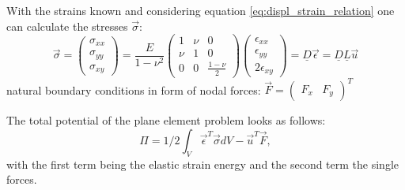 \documentclass[11pt,twoside]{scrartcl}
\begin{document}
  With the strains known and considering equation \ref{eq:displ_strain_relation} one can calculate the stresses $\vec{\sigma}$:
  \begin{equation}
  \vec{\sigma} = \begin{pmatrix}
  \sigma_{xx} \\
  \sigma_{yy} \\
  \sigma_{xy}
  \end{pmatrix} = \frac{E}{1-\nu^2} \begin{pmatrix}
  1 & \nu & 0 \\
  \nu & 1 & 0 \\
  0 & 0 & \frac{1-\nu}{2}
  \end{pmatrix} \begin{pmatrix}
  \epsilon_{xx} \\
  \epsilon_{yy} \\
  2\epsilon_{xy}
  \end{pmatrix} = \underline{D} \vec{\epsilon} = \underline{D} \underline{L} \vec{u}
  \end{equation}
  natural boundary conditions in form of nodal forces: $\vec{F} = \begin{pmatrix}
  F_x & F_y
  \end{pmatrix}^T$
  
  The total potential of the plane element problem looks as follows:
  \begin{equation}
  \Pi = 1/2 \int_{V}\vec{\epsilon}^T\vec{\sigma}dV - \vec{u}^T \vec{F},
  \end{equation}
  with the first term being the elastic strain energy and the second term the single forces.
  
\end{document}
